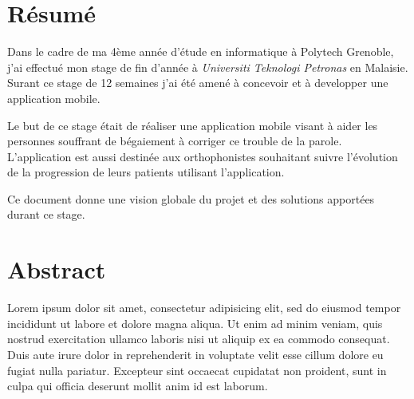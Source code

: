 \chapter*{Résumé}
Dans le cadre de ma 4ème année d'étude en informatique à Polytech Grenoble, j'ai effectué mon stage de fin d'année à \textit{Universiti Teknologi Petronas} en Malaisie. Surant ce stage de 12 semaines j'ai été amené à concevoir et à developper une application mobile.

Le but de ce stage était de réaliser une application mobile visant à aider les personnes souffrant de bégaiement à corriger ce trouble de la parole. L'application est aussi destinée aux orthophonistes souhaitant suivre l'évolution de la progression de leurs patients utilisant l'application.

Ce document donne une vision globale du projet et des solutions apportées durant ce stage.

\vspace{4cm}

\begingroup
\let\clearpage\relax
\chapter*{Abstract}
\endgroup

Lorem ipsum dolor sit amet, consectetur adipisicing elit, sed do eiusmod tempor incididunt ut labore et dolore magna aliqua. Ut enim ad minim veniam, quis nostrud exercitation ullamco laboris nisi ut aliquip ex ea commodo consequat. Duis aute irure dolor in reprehenderit in voluptate velit esse cillum dolore eu fugiat nulla pariatur. Excepteur sint occaecat cupidatat non proident, sunt in culpa qui officia deserunt mollit anim id est laborum.
